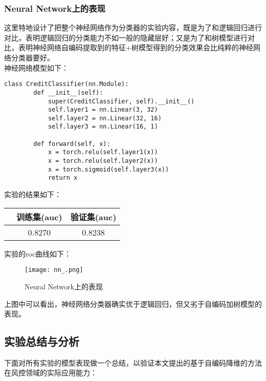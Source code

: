 \subsubsection{Neural Network上的表现}
这里特地设计了把整个神经网络作为分类器的实验内容，既是为了和逻辑回归进行对比，表明逻辑回归的分类能力不如一般的隐藏层好；又是为了和树模型进行对比，表明神经网络自编码提取到的特征+树模型得到的分类效果会比纯粹的神经网络分类器要好。\\

神经网络模型如下：
\begin{lstlisting}[frame=shadowbox]
    class CreditClassifier(nn.Module):
        def __init__(self):
            super(CreditClassifier, self).__init__()
            self.layer1 = nn.Linear(3, 32)
            self.layer2 = nn.Linear(32, 16)
            self.layer3 = nn.Linear(16, 1)
            
        def forward(self, x):
            x = torch.relu(self.layer1(x))
            x = torch.relu(self.layer2(x))
            x = torch.sigmoid(self.layer3(x))
            return x
\end{lstlisting}

实验的结果如下：

\begin{center}
    \begin{tabular}{ccc}
        \hline
         & 训练集(auc) & 验证集(auc) \\
        \hline
         & 0.8270      & 0.8238      \\
        \hline
    \end{tabular}
\end{center}

实验的roc曲线如下：
\begin{figure}[H]
    \centering
    \texttt{[image: nn\_.png]}
    \caption{Neural Network上的表现}
    \label{fig:nn}
\end{figure}

上图中可以看出，神经网络分类器确实优于逻辑回归，但又劣于自编码加树模型的表现。

\subsection{实验总结与分析}

下面对所有实验的模型表现做一个总结，以验证本文提出的基于自编码降维的方法在风控领域的实际应用能力：\\

